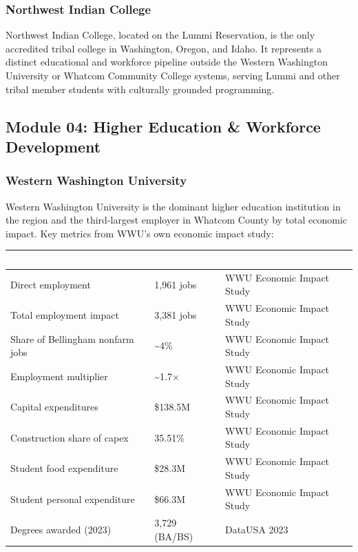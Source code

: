 \documentclass[11pt,letterpaper]{article}
\newcommand{\tableheader}[1]{\textbf{\sffamily\textcolor{white}{#1}}}
\begin{document}
\subsubsection{Northwest Indian College}

Northwest Indian College, located on the Lummi Reservation, is the only accredited tribal college in Washington, Oregon, and Idaho. It represents a distinct educational and workforce pipeline outside the Western Washington University or Whatcom Community College systems, serving Lummi and other tribal member students with culturally grounded programming.

\subsection{Module 04: Higher Education \& Workforce Development}

\subsubsection{Western Washington University}

Western Washington University is the dominant higher education institution in the region and the third-largest employer in Whatcom County by total economic impact. Key metrics from WWU's own economic impact study:

\begin{center}
\begin{tabularx}{\textwidth}{LC{3.5cm}L{3.5cm}}
\toprule
{}
\tableheader{Metric} & \tableheader{Value} & \tableheader{Source} \\
\midrule
Direct employment & 1,961 jobs & WWU Economic Impact Study \\
Total employment impact & 3,381 jobs & WWU Economic Impact Study \\
Share of Bellingham nonfarm jobs & \textasciitilde4\% & WWU Economic Impact Study \\
Employment multiplier & \textasciitilde1.7$\times$ & WWU Economic Impact Study \\
Capital expenditures & \$138.5M & WWU Economic Impact Study \\
Construction share of capex & 35.51\% & WWU Economic Impact Study \\
Student food expenditure & \$28.3M & WWU Economic Impact Study \\
Student personal expenditure & \$66.3M & WWU Economic Impact Study \\
Degrees awarded (2023) & 3,729 (BA/BS) & DataUSA 2023 \\
\bottomrule
\end{tabularx}
\end{center}
\end{document}
